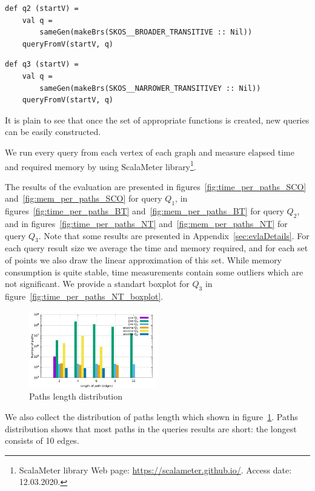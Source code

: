 \begin{lstlisting}
def q2 (startV) =
    val q =
        sameGen(makeBrs(SKOS__BROADER_TRANSITIVE :: Nil))
    queryFromV(startV, q)
\end{lstlisting}

\begin{lstlisting}
def q3 (startV) =
    val q =
        sameGen(makeBrs(SKOS__NARROWER_TRANSITIVEY :: Nil))
    queryFromV(startV, q)
\end{lstlisting}

It is plain to see that once the set of appropriate functions is created, new queries can be easily constructed.

We run every query from each vertex of each graph and measure elapsed time and required memory by using ScalaMeter library\footnote{ScalaMeter library Web page: \url{https://scalameter.github.io/}. Access date: 12.03.2020.}.

The results of the evaluation are presented in figures~\ref{fig:time_per_paths_SCO} and~\ref{fig:mem_per_paths_SCO} for query $Q_1$, in figures~\ref{fig:time_per_paths_BT} and~\ref{fig:mem_per_paths_BT} for query $Q_2$, and in figures~\ref{fig:time_per_paths_NT} and~\ref{fig:mem_per_paths_NT} for query $Q_3$.
Note that some results are presented in Appendix~\ref{sec:evlaDetails}.
For each query result size we average the time and memory required, and for each set of points we also draw the linear approximation of this set.
While memory consumption is quite stable, time measurements contain some outliers which are not significant.
We provide a standart boxplot for $Q_3$ in figure~\ref{fig:time_per_paths_NT_boxplot}.

\begin{figure}[ht]
  \begin{center}
    \includegraphics[width=0.5\textwidth]{data/path_per_length.pdf}
    \caption{Paths length distribution}\label{fig:pLength}
  \end{center}
\end{figure}

We also collect the distribution of paths length which shown in figure~\ref{fig:pLength}.
Paths distribution shows that most paths in the queries results are short: the longest consists of 10 edges.

